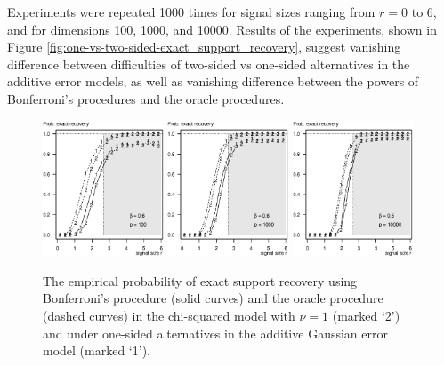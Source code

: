 Experiments were repeated 1000 times for signal sizes ranging from $r=0$ to $6$, and for dimensions 100, 1000, and 10000.
Results of the experiments, shown in Figure \ref{fig:one-vs-two-sided-exact_support_recovery}, suggest vanishing difference between difficulties of two-sided vs one-sided alternatives in the additive error models, as well as vanishing difference between the powers of Bonferroni's procedures and the oracle procedures.

\begin{figure}
      \centering
      \includegraphics[width=0.32\textwidth]{./sim_one-vs-two-sided/exact_recovery_one-vs-two-sided_beta06_p100.eps}
      \includegraphics[width=0.32\textwidth]{./sim_one-vs-two-sided/exact_recovery_one-vs-two-sided_beta06_p1000.eps}
      \includegraphics[width=0.32\textwidth]{./sim_one-vs-two-sided/exact_recovery_one-vs-two-sided_beta06_p10000.eps}
      \caption{The empirical probability of exact support recovery using Bonferroni's procedure (solid curves) and the oracle procedure (dashed curves) in the chi-squared model with $\nu=1$ (marked `2') and under one-sided alternatives in the additive Gaussian error model (marked `1'). 
}
\end{figure}
